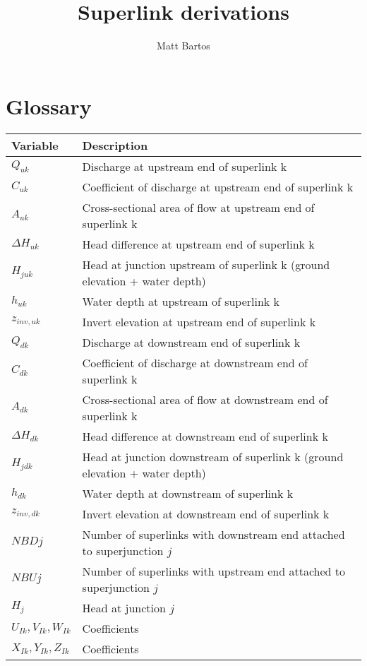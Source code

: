 \documentclass[11pt]{article}
\title{Superlink derivations}
\author{Matt Bartos}
\date{}
\begin{document}
\maketitle
\tableofcontents

\clearpage

\section{Glossary}

\begin{table}[!htb]
  \centering
  \begin{tabular}{l | l}
    \hline
    Variable & Description \\
    \hline
    $Q_{uk}$ & Discharge at upstream end of superlink k \\
    $C_{uk}$ & Coefficient of discharge at upstream end of superlink k \\
    $A_{uk}$ & Cross-sectional area of flow at upstream end of superlink k \\
    $\Delta H_{uk}$ & Head difference at upstream end of superlink k \\
    $H_{juk}$ & Head at junction upstream of superlink k (ground elevation + water depth) \\
    $h_{uk}$ & Water depth at upstream of superlink k \\
    $z_{inv, uk}$ & Invert elevation at upstream end of superlink k \\
    $Q_{dk}$ & Discharge at downstream end of superlink k \\
    $C_{dk}$ & Coefficient of discharge at downstream end of superlink k \\
    $A_{dk}$ & Cross-sectional area of flow at downstream end of superlink k \\
    $\Delta H_{dk}$ & Head difference at downstream end of superlink k \\
    $H_{jdk}$ & Head at junction downstream of superlink k (ground elevation + water depth) \\
    $h_{dk}$ & Water depth at downstream of superlink k \\
    $z_{inv, dk}$ & Invert elevation at downstream end of superlink k \\
    $NBDj$ & Number of superlinks with downstream end attached to superjunction $j$ \\
    $NBUj$ & Number of superlinks with upstream end attached to superjunction $j$ \\
    $H_j$ & Head at junction $j$ \\
    $U_{Ik}, V_{Ik}, W_{Ik}$ & Coefficients \\
    $X_{Ik}, Y_{Ik}, Z_{Ik}$ & Coefficients \\
    \hline
  \end{tabular}
\end{table}
\end{document}
